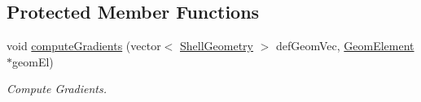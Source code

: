 \subsection*{Protected Member Functions}
\begin{DoxyCompactItemize}
\item 
\hypertarget{classvoom_1_1_l_b_model_ad620e7538265eb031a1a121ca71c4415}{
void \hyperlink{classvoom_1_1_l_b_model_ad620e7538265eb031a1a121ca71c4415}{computeGradients} (vector$<$ \hyperlink{classvoom_1_1_shell_geometry}{ShellGeometry} $>$ defGeomVec, \hyperlink{classvoom_1_1_geom_element}{GeomElement} $\ast$geomEl)}
\label{classvoom_1_1_l_b_model_ad620e7538265eb031a1a121ca71c4415}

\begin{DoxyCompactList}\small\item\em Compute Gradients. \item\end{DoxyCompactList}\end{DoxyCompactItemize}
